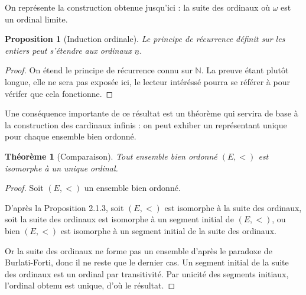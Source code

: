 \documentclass{article}
\theoremstyle{definition}
\theoremstyle{plain}
\newtheorem{proposition}[subsubsection]{Proposition}
\newtheorem{theorem}[subsubsection]{Théorème}
\theoremstyle{plain}
\theoremstyle{plain}
\theoremstyle{plain}
\theoremstyle{plain}
\begin{document}
\par On représente la construction obtenue jusqu'ici : la suite des ordinaux où \( \omega \) est un ordinal limite.
\begin{center}
\end{center}

\begin{proposition}[Induction ordinale]
	Le principe de récurrence définit sur les entiers peut s'étendre aux ordinaux \( \underline{n} \).
\end{proposition}
\begin{proof}
	On étend le principe de récurrence connu sur \( \mathbb{N} \). La preuve étant plutôt longue, elle ne sera pas exposée ici, le lecteur intéréssé pourra se référer à \cite{dehornoy2017théorie} pour vérifer que cela fonctionne.
\end{proof}

\par Une conséquence importante de ce résultat est un théorème qui servira de base à la construction des cardinaux infinis : on peut exhiber un représentant unique pour chaque ensemble bien ordonné.

\begin{theorem}[Comparaison]
	Tout ensemble bien ordonné \( (E,<) \) est isomorphe à un unique ordinal.
\end{theorem}
\begin{proof}
	Soit \( (E,<) \) un ensemble bien ordonné. 
	
	D'après la Proposition 2.1.3, soit \( (E,<) \) est isomorphe à la suite des ordinaux, soit la suite des ordinaux est isomorphe à un segment initial de \( (E,<) \), ou bien \( (E,<) \) est isomorphe à un segment initial de la suite des ordinaux.

	Or la suite des ordinaux ne forme pas un ensemble d'après le paradoxe de Burlati-Forti, donc il ne reste que le dernier cas. Un segment initial de la suite des ordinaux est un ordinal par transitivité. Par unicité des segments initiaux, l'ordinal obtenu est unique, d'où le résultat. 
\end{proof}
\end{document}
